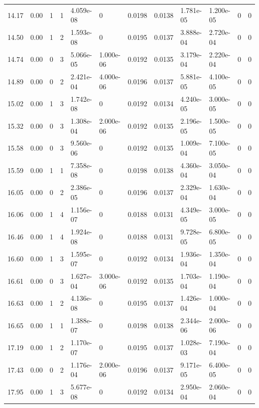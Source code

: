 \documentclass[preview]{standalone}
\begin{document}
{{{\begin{tabular}{L{1.2cm}C{1.2cm} C{0.3cm}C{0.5cm} C{1.4cm}C{1.4cm} C{1.4cm}C{1.4cm} C{1.6cm}C{1.6cm} C{1.6cm}C{1.6cm}}
  14.17  &  0.00  & 1     &  1 &  4.059e-08  & 0  &  0.0198&   0.0138& 1.781e-05 & 1.200e-05   &  0 & 0  \\ 
  14.50  &  0.00  & 1     &  2 &  1.593e-08  & 0  &  0.0195&   0.0137& 3.888e-04 & 2.720e-04   &  0 & 0  \\ 
  14.74  &  0.00  & 0     &  3 &  5.066e-05  & 1.000e-06  &  0.0192&   0.0135& 3.179e-04 & 2.220e-04   &  0 & 0  \\ 
  14.89  &  0.00  & 0     &  2 &  2.421e-04  & 4.000e-06  &  0.0196&   0.0137& 5.881e-05 & 4.100e-05   &  0 & 0  \\ 
  15.02  &  0.00  & 1     &  3 &  1.742e-08  & 0  &  0.0192&   0.0134& 4.240e-05 & 3.000e-05   &  0 & 0  \\ 
  15.32  &  0.00  & 0     &  3 &  1.308e-04  & 2.000e-06  &  0.0192&   0.0135& 2.196e-05 & 1.500e-05   &  0 & 0  \\ 
  15.58  &  0.00  & 0     &  3 &  9.560e-06  & 0  &  0.0192&   0.0135& 1.009e-04 & 7.100e-05   &  0 & 0  \\ 
  15.59  &  0.00  & 1     &  1 &  7.358e-08  & 0  &  0.0198&   0.0138& 4.360e-04 & 3.050e-04   &  0 & 0  \\ 
  16.05  &  0.00  & 0     &  2 &  2.386e-05  & 0  &  0.0196&   0.0137& 2.329e-04 & 1.630e-04   &  0 & 0  \\ 
  16.06  &  0.00  & 1     &  4 &  1.156e-07  & 0  &  0.0188&   0.0131& 4.349e-05 & 3.000e-05   &  0 & 0  \\ 
  16.46  &  0.00  & 1     &  4 &  1.924e-08  & 0  &  0.0188&   0.0131& 9.728e-05 & 6.800e-05   &  0 & 0  \\ 
  16.60  &  0.00  & 1     &  3 &  1.595e-07  & 0  &  0.0192&   0.0134& 1.936e-04 & 1.350e-04   &  0 & 0  \\ 
  16.61  &  0.00  & 0     &  3 &  1.627e-04  & 3.000e-06  &  0.0192&   0.0135& 1.703e-04 & 1.190e-04   &  0 & 0  \\ 
  16.63  &  0.00  & 1     &  2 &  4.136e-08  & 0  &  0.0195&   0.0137& 1.426e-04 & 1.000e-04   &  0 & 0  \\ 
  16.65  &  0.00  & 1     &  1 &  1.388e-07  & 0  &  0.0198&   0.0138& 2.344e-06 & 2.000e-06   &  0 & 0  \\ 
  17.19  &  0.00  & 1     &  2 &  1.170e-07  & 0  &  0.0195&   0.0137& 1.028e-03 & 7.190e-04   &  0 & 0  \\ 
  17.43  &  0.00  & 0     &  2 &  1.176e-04  & 2.000e-06  &  0.0196&   0.0137& 9.171e-05 & 6.400e-05   &  0 & 0  \\ 
  17.95  &  0.00  & 1     &  3 &  5.677e-08  & 0  &  0.0192&   0.0134& 2.950e-04 & 2.060e-04   &  0 & 0  \\ 

\end{tabular}}}}
\end{document}
